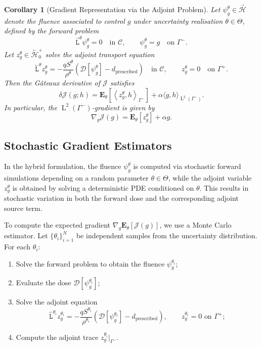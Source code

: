 \documentclass{amsart}
\newcommand{\fL}{\stackrel{_\rightarrow}{\mathtt L}}
\newcommand{\bL}{\stackrel{_\leftarrow}{\mathtt L}}
\theoremstyle{plain}
\newtheorem{corollary}[theorem]{Corollary}
\newcommand{\leb}{\text{Leb}}
\newcommand{\LL}{\ensuremath{\operatorname L}\xspace}
\renewcommand{\leb}[1]{\ensuremath{\LL^{#1}}}
\newcommand{\ltwop}[2]{\ensuremath{\!\left\langle{#1,#2}\right\rangle}}
\newcommand{\cH}{\stackrel{_\rightarrow}{\mathscr H}}
\newcommand{\cbH}{\stackrel{_\leftarrow}{\mathscr H}}
\begin{document}
\begin{corollary}[Gradient Representation via the Adjoint Problem]
  Let $\psi_g^\theta \in \cH$ denote the fluence associated to control
  $g$ under uncertainty realisation $\theta \in \Theta$, defined by
  the forward problem
  \begin{equation}
    \fL^\theta \psi_g^\theta = 0 \quad \text{in } \mathcal{C}, \qquad \psi_g^\theta = g \quad \text{on } \Gamma^-.
  \end{equation}
  Let $z_g^\theta \in \cbH_0^+$ solve the adjoint transport equation
  \begin{equation}
    \bL^\theta z_g^\theta = -\frac{q S^\theta}{\rho^\theta} \left( \mathcal{D}[\psi_g^\theta] - d_{\mathrm{prescribed}} \right) \quad \text{in } \mathcal{C}, \qquad z_g^\theta = 0 \quad \text{on } \Gamma^+.
  \end{equation}
  Then the Gâteaux derivative of $\mathcal{J}$ satisfies
  \begin{equation}
    \delta \mathcal{J}(g; h) = \mathbf{E}_\theta \left[ \ltwop{z_g^\theta}{h}_{\Gamma^-} \right] + \alpha \langle g, h \rangle_{\leb2(\Gamma^-)}.
  \end{equation}
  In particular, the $\leb2(\Gamma^-)$-gradient is given by
  \begin{equation}
    \nabla_g \mathcal{J}(g) = \mathbf{E}_\theta [z_g^\theta] + \alpha g.
  \end{equation}
\end{corollary}

\subsection{Stochastic Gradient Estimators}
\label{subsec:stochastic-gradients}

In the hybrid formulation, the fluence $\psi_g^\theta$ is computed via
stochastic forward simulations depending on a random parameter $\theta
\in \Theta$, while the adjoint variable $z_g^\theta$ is obtained by
solving a deterministic PDE conditioned on $\theta$. This results in
stochastic variation in both the forward dose and the corresponding
adjoint source term.

To compute the expected gradient $\nabla_g
\mathbf{E}_\theta[\mathcal{J}(g)]$, we use a Monte Carlo
estimator. Let $\{ \theta_i \}_{i=1}^N$ be independent samples from
the uncertainty distribution. For each $\theta_i$:

\begin{enumerate}
  \item Solve the forward problem to obtain the fluence $\psi_g^{\theta_i}$;
  \item Evaluate the dose $\mathcal{D}[\psi_g^{\theta_i}]$;
  \item Solve the adjoint equation
  \begin{equation}
    \bL^{\theta_i} z_g^{\theta_i} = -\frac{q S^{\theta_i}}{\rho^{\theta_i}} \left( \mathcal{D}[\psi_g^{\theta_i}] - d_{\mathrm{prescribed}} \right), \qquad z_g^{\theta_i} = 0 \text{ on } \Gamma^+;
  \end{equation}
  \item Compute the adjoint trace $z_g^{\theta_i}|_{\Gamma^-}$.
\end{enumerate}
\end{document}
